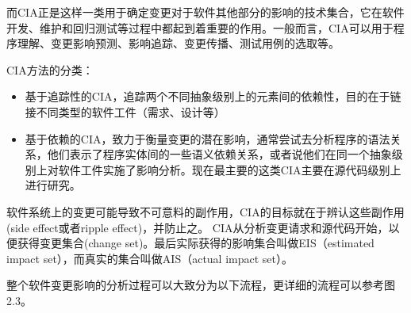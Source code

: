 而CIA正是这样一类用于确定变更对于软件其他部分的影响的技术集合，它在软件开发、维护和回归测试等过程中都起到着重要的作用。一般而言，CIA可以用于程序理解、变更影响预测、影响追踪、变更传播、测试用例的选取等。

CIA方法的分类：
\begin{itemize}
	\item 基于追踪性的CIA，追踪两个不同抽象级别上的元素间的依赖性，目的在于链接不同类型的软件工件（需求、设计等）

	\item 基于依赖的CIA，致力于衡量变更的潜在影响，通常尝试去分析程序的语法关系，他们表示了程序实体间的一些语义依赖关系，或者说他们在同一个抽象级别上对软件工件实施了影响分析。现在最主要的这类CIA主要在源代码级别上进行研究。
\end{itemize}

软件系统上的变更可能导致不可意料的副作用，CIA的目标就在于辨认这些副作用(side effect或者ripple effect)，并防止之。
CIA从分析变更请求和源代码开始，以便获得变更集合(change set)。最后实际获得的影响集合叫做EIS（estimated impact set），而真实的集合叫做AIS（actual impact set）。

整个软件变更影响的分析过程可以大致分为以下流程，更详细的流程可以参考图2.3。

